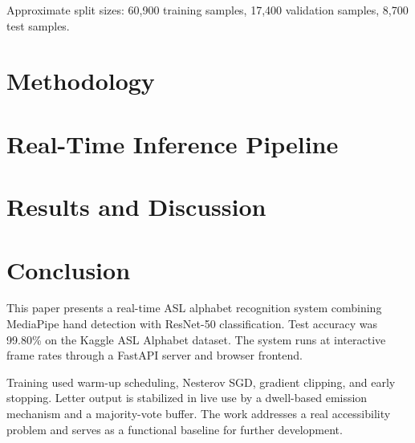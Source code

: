\documentclass[conference]{IEEEtran}
\begin{document}
Approximate split sizes: 60,900 training samples, 17,400 validation samples, 8,700 test samples.

\section{Methodology}


\section{Real-Time Inference Pipeline}

\section{Results and Discussion}


\section{Conclusion}

This paper presents a real-time ASL alphabet recognition system combining MediaPipe 
hand detection with ResNet-50 classification. Test accuracy was 99.80\% on the Kaggle 
ASL Alphabet dataset. The system runs at interactive frame rates through a FastAPI 
server and browser frontend.

Training used warm-up scheduling, Nesterov SGD, gradient clipping, and early stopping. 
Letter output is stabilized in live use by a dwell-based emission mechanism and a 
majority-vote buffer. The work addresses a real accessibility problem and serves as 
a functional baseline for further development.
\end{document}
